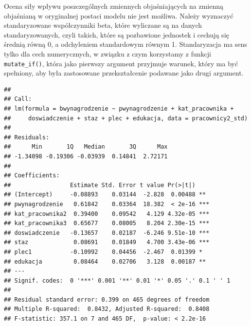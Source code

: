 \documentclass[]{book}
\newenvironment{Shaded}{\begin{snugshade}}{\end{snugshade}}
\newcommand{\DataTypeTok}[1]{\textcolor[rgb]{0.13,0.29,0.53}{#1}}
\newcommand{\KeywordTok}[1]{\textcolor[rgb]{0.13,0.29,0.53}{\textbf{#1}}}
\newcommand{\NormalTok}[1]{#1}
\newcommand{\OperatorTok}[1]{\textcolor[rgb]{0.81,0.36,0.00}{\textbf{#1}}}
\newcommand{\StringTok}[1]{\textcolor[rgb]{0.31,0.60,0.02}{#1}}
\begin{document}
Ocena siły wpływu poszczególnych zmiennych objaśniających na zmienną objaśnianą w oryginalnej postaci modelu nie jest możliwa. Należy wyznaczyć standaryzowane współczynniki beta, które wyliczane są na danych standaryzowanych, czyli takich, które są pozbawione jednostek i cechują się średnią równą 0, a odchyleniem standardowym równym 1. Standaryzacja ma sens tylko dla cech numerycznych, w związku z czym korzystamy z funkcji \texttt{mutate\_if()}, która jako pierwszy argument przyjmuje warunek, który ma być spełniony, aby była zastosowane przekształcenie podawane jako drugi argument.

\begin{Shaded}
\end{Shaded}

\begin{verbatim}
## 
## Call:
## lm(formula = bwynagrodzenie ~ pwynagrodzenie + kat_pracownika + 
##     doswiadczenie + staz + plec + edukacja, data = pracownicy2_std)
## 
## Residuals:
##      Min       1Q   Median       3Q      Max 
## -1.34098 -0.19306 -0.03939  0.14841  2.72171 
## 
## Coefficients:
##                 Estimate Std. Error t value Pr(>|t|)    
## (Intercept)     -0.08893    0.03144  -2.828  0.00488 ** 
## pwynagrodzenie   0.61842    0.03364  18.382  < 2e-16 ***
## kat_pracownika2  0.39400    0.09542   4.129 4.32e-05 ***
## kat_pracownika3  0.65677    0.08005   8.204 2.30e-15 ***
## doswiadczenie   -0.13657    0.02187  -6.246 9.51e-10 ***
## staz             0.08691    0.01849   4.700 3.43e-06 ***
## plec1           -0.10992    0.04456  -2.467  0.01399 *  
## edukacja         0.08464    0.02706   3.128  0.00187 ** 
## ---
## Signif. codes:  0 '***' 0.001 '**' 0.01 '*' 0.05 '.' 0.1 ' ' 1
## 
## Residual standard error: 0.399 on 465 degrees of freedom
## Multiple R-squared:  0.8432, Adjusted R-squared:  0.8408 
## F-statistic: 357.1 on 7 and 465 DF,  p-value: < 2.2e-16
\end{verbatim}
\end{document}
